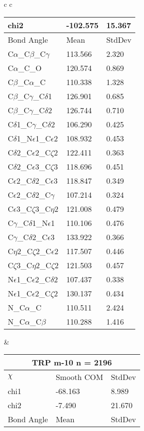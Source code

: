\begin{longtable}{ c c }
\begin{tabular}{ l l l }
  chi2 & -102.575 & 15.367 \\ \midrule
  Bond Angle   & Mean     & StdDev \\ \midrule
  C$\alpha$\_C$\beta$\_C$\gamma$ & 113.566 & 2.320\\
  C$\alpha$\_C\_O & 120.574 & 0.869\\
  C$\beta$\_C$\alpha$\_C & 110.338 & 1.328\\
  C$\beta$\_C$\gamma$\_C$\delta$1 & 126.901 & 0.685\\
  C$\beta$\_C$\gamma$\_C$\delta$2 & 126.744 & 0.710\\
  C$\delta$1\_C$\gamma$\_C$\delta$2 & 106.290 & 0.425\\
  C$\delta$1\_N$\epsilon$1\_C$\epsilon$2 & 108.932 & 0.453\\
  C$\delta$2\_C$\epsilon$2\_C$\zeta$2 & 122.411 & 0.363\\
  C$\delta$2\_C$\epsilon$3\_C$\zeta$3 & 118.696 & 0.451\\
  C$\epsilon$2\_C$\delta$2\_C$\epsilon$3 & 118.847 & 0.349\\
  C$\epsilon$2\_C$\delta$2\_C$\gamma$ & 107.214 & 0.324\\
  C$\epsilon$3\_C$\zeta$3\_C$\eta$2 & 121.008 & 0.479\\
  C$\gamma$\_C$\delta$1\_N$\epsilon$1 & 110.106 & 0.476\\
  C$\gamma$\_C$\delta$2\_C$\epsilon$3 & 133.922 & 0.366\\
  C$\eta$2\_C$\zeta$2\_C$\epsilon$2 & 117.507 & 0.446\\
  C$\zeta$3\_C$\eta$2\_C$\zeta$2 & 121.503 & 0.457\\
  N$\epsilon$1\_C$\epsilon$2\_C$\delta$2 & 107.437 & 0.338\\
  N$\epsilon$1\_C$\epsilon$2\_C$\zeta$2 & 130.137 & 0.434\\
  N\_C$\alpha$\_C & 110.511 & 2.424\\
  N\_C$\alpha$\_C$\beta$ & 110.288 & 1.416\\
  \bottomrule
  \end{tabular}
  &
  \begin{tabular}{ l l l }
  \toprule
  \multicolumn{3}{c}{TRP \textbf{m-10} n = 2196} \\ \toprule
  $\chi$       & Smooth COM & StdDev \\ \midrule
  chi1 & -68.163 & 8.989 \\ 
  chi2 & -7.490 & 21.670 \\ \midrule
  Bond Angle   & Mean     & StdDev \\ \midrule

\end{tabular}
\end{longtable}
